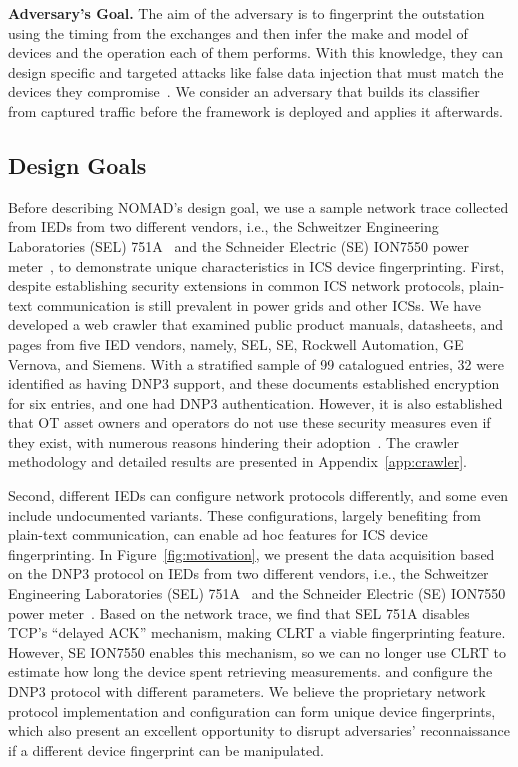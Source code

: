 \textbf{Adversary's Goal.} The aim of the adversary is to fingerprint the outstation using the timing from the exchanges and then infer the make and model of devices and the operation each of them performs. With this knowledge, they can design specific and targeted attacks like false data injection that must match the devices they compromise~\cite{liufdia2009}.
We consider an  adversary that builds its classifier from captured traffic before the framework is deployed and applies it afterwards.

\subsection{Design Goals}

Before describing NOMAD's design goal, we use a sample network trace collected from IEDs from two different vendors, i.e., the Schweitzer Engineering Laboratories (SEL) 751A~\cite{sel751a} and the Schneider Electric (SE) ION7550 power meter~\cite{seion7550}, to demonstrate unique characteristics in ICS device fingerprinting. First, despite establishing security extensions in common ICS network protocols, plain-text communication is still prevalent in power grids and other ICSs. We have developed a web crawler that examined public product manuals, datasheets, and pages from five IED vendors, namely, SEL, SE, Rockwell Automation, GE Vernova, and Siemens. With a stratified sample of 99 catalogued entries, 32 were identified as having DNP3 support, and these documents established encryption for six entries, and one had DNP3 authentication. However, it is also established that OT asset owners and operators do not use these security measures even if they exist, with numerous reasons hindering their adoption~\cite{CISA2026SecureOT}. The crawler methodology and detailed results are presented in Appendix~\ref{app:crawler}.


Second, different IEDs can configure network protocols differently, and some even include undocumented variants. These configurations, largely benefiting from plain-text communication, can enable ad hoc features for ICS device fingerprinting. In Figure~\ref{fig:motivation}, we present the data acquisition based on the DNP3 protocol on IEDs from two different vendors, i.e., the Schweitzer Engineering Laboratories (SEL) 751A~\cite{sel751a} and the Schneider Electric (SE) ION7550 power meter~\cite{seion7550}. Based on the network trace, we find that SEL 751A disables TCP's ``delayed ACK'' mechanism, making CLRT a viable fingerprinting feature. However, SE ION7550 enables this mechanism, so we can no longer use CLRT to estimate how long the device spent retrieving measurements.  and configure the DNP3 protocol with different parameters. We believe the proprietary network protocol implementation and configuration can form unique device fingerprints, which also present an excellent opportunity to disrupt adversaries' reconnaissance if a different device fingerprint can be manipulated.

